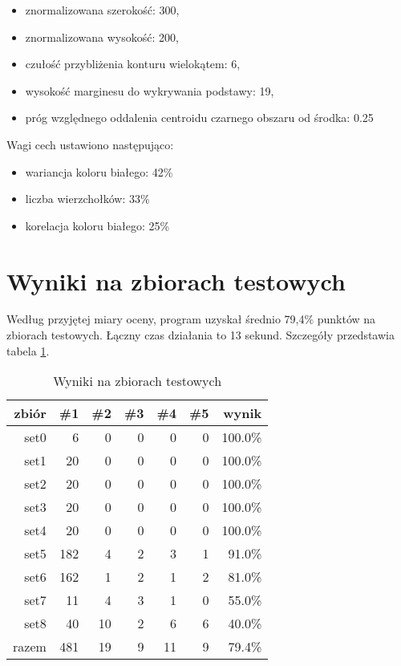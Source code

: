 \documentclass{mwart}
\begin{document}
\begin{itemize}
    \item znormalizowana szerokość: 300,
    \item znormalizowana wysokość: 200,
    \item czułość przybliżenia konturu wielokątem: 6,
    \item wysokość marginesu do wykrywania podstawy: 19,
    \item próg względnego oddalenia centroidu czarnego obszaru od środka: 0.25
\end{itemize}

Wagi cech ustawiono następująco:

\begin{itemize}
    \item wariancja koloru białego: 42\%
    \item liczba wierzchołków: 33\%
    \item korelacja koloru białego: 25\%
\end{itemize}

\section{Wyniki na zbiorach testowych}

Według przyjętej miary oceny, program uzyskał średnio 79,4\% punktów na zbiorach testowych. Łączny czas działania to 13 sekund. Szczegóły przedstawia tabela \ref{table:score}.

\begin{table}
\centering\begin{tabular}{|r|rrrrr|r|}
\hline
zbiór & \#1 & \#2 & \#3 & \#4 & \#5 & wynik \\ \hline
set0  & 6   & 0  & 0 & 0  & 0 & 100.0\% \\
set1  & 20  & 0  & 0 & 0  & 0 & 100.0\% \\
set2  & 20  & 0  & 0 & 0  & 0 & 100.0\% \\
set3  & 20  & 0  & 0 & 0  & 0 & 100.0\% \\
set4  & 20  & 0  & 0 & 0  & 0 & 100.0\% \\
set5  & 182 & 4  & 2 & 3  & 1 & 91.0\%  \\
set6  & 162 & 1  & 2 & 1  & 2 & 81.0\%  \\
set7  & 11  & 4  & 3 & 1  & 0 & 55.0\%  \\
set8  & 40  & 10 & 2 & 6  & 6 & 40.0\%  \\\hline
razem & 481 & 19 & 9 & 11 & 9 & 79.4\% \\
\hline
\end{tabular}
\caption{Wyniki na zbiorach testowych}\label{table:score}
\end{table}
\end{document}
